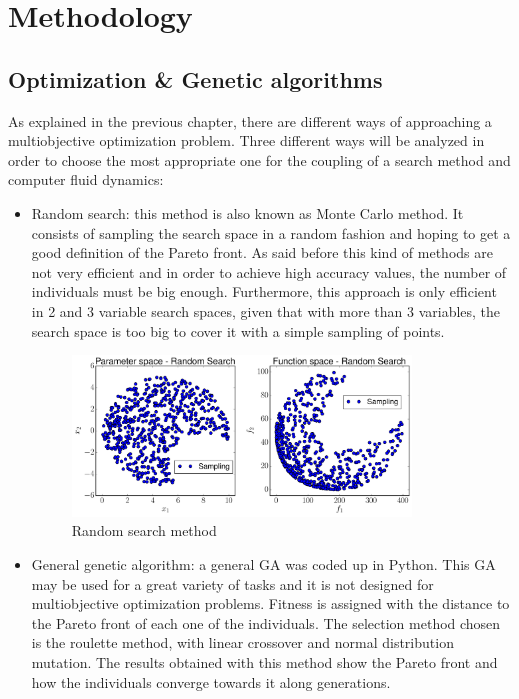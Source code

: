 \chapter{Methodology}

\section{Optimization \& Genetic algorithms}

As explained in the previous chapter, there are different ways of approaching a multiobjective optimization problem. Three different ways will be analyzed in order to choose the most appropriate one for the coupling of a search method and computer fluid dynamics: 

\begin{itemize}
    \item Random search: this method is also known as Monte Carlo method. It consists of sampling the search space in a random fashion and hoping to get a good definition of the Pareto front. As said before this kind of methods are not very efficient and in order to achieve high accuracy values, the number of individuals must be big enough. Furthermore, this approach is only efficient in 2 and 3 variable search spaces, given that with more than 3 variables, the search space is too big to cover it with a simple sampling of points.
    \begin{figure}[h!]
        \centering
        \includegraphics[width=0.85\textwidth]{Figures/3/mode_randomSearch.pdf}
        \caption{Random search method}
        \label{fig:randomSearch}
    \end{figure}
    \item General genetic algorithm: a general GA was coded up in Python. This GA may be used for a great variety of tasks and it is not designed for multiobjective optimization problems. Fitness is assigned with the distance to the Pareto front of each one of the individuals. The selection method chosen is the roulette method, with linear crossover and normal distribution mutation. The results obtained with this method show the Pareto front and how the individuals converge towards it along generations.     \begin{figure}[h!]

\end{figure}
\end{itemize}
